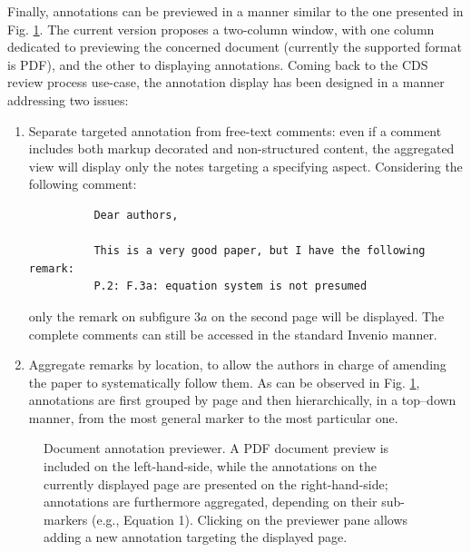 Finally, annotations can be previewed in a manner similar to the one presented
in Fig. \ref{fig:noteview}. The current version proposes a two-column window,
with one column dedicated to previewing the concerned document (currently the
supported format is PDF), and the other to displaying annotations. Coming
back to the CDS review process use-case, the annotation display has been
designed in a manner addressing two issues:
\begin{enumerate}
  \item Separate targeted annotation from free-text comments: even if a comment
        includes both markup decorated and non-structured content, the
        aggregated view will display only the notes targeting a specifying
        aspect. Considering the following comment:
        \begin{verbatim}
          Dear authors,

          This is a very good paper, but I have the following remark:
          P.2: F.3a: equation system is not presumed 
        \end{verbatim}
        only the remark on subfigure $3a$ on the second page will be displayed.
        The complete comments can still be accessed in the standard Invenio
        manner.
  \item Aggregate remarks by location, to allow the authors in charge of
        amending the paper to systematically follow them. As can be observed in
        Fig. \ref{fig:noteview}, annotations are first grouped by page and then
        hierarchically, in a top--down manner, from the most general marker to
        the most particular one.
\end{enumerate}

\begin{figure}[!ht]
  \centering
  \caption[Document annotation previewer]
          {Document annotation previewer. A PDF document preview is included on
           the left-hand-side, while the annotations on the currently displayed
           page are presented on the right-hand-side; annotations are
           furthermore aggregated, depending on their sub-markers (e.g.,
           Equation 1). Clicking on the previewer pane allows adding a new
           annotation targeting the displayed page.}
  \label{fig:noteview}
\end{figure}
